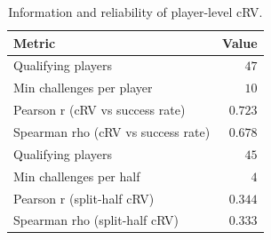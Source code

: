\begin{table}[h]
\centering
\caption{Information and reliability of player-level cRV.}
\label{tab:info}
\small
\begin{tabular}{lr}
\toprule
Metric & Value \\
\midrule
Qualifying players & $47$ \\
Min challenges per player & $10$ \\
Pearson r (cRV vs success rate) & $0.723$ \\
Spearman rho (cRV vs success rate) & $0.678$ \\
Qualifying players & $45$ \\
Min challenges per half & $4$ \\
Pearson r (split-half cRV) & $0.344$ \\
Spearman rho (split-half cRV) & $0.333$ \\
\bottomrule
\end{tabular}
\end{table}
